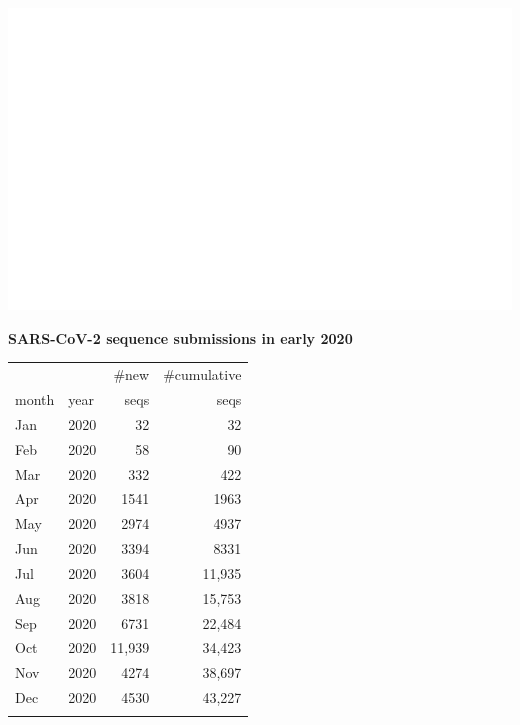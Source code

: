 \documentclass[landscape]{slides}
\begin{document}
\begin{slide}

\includegraphics[width=7in]{figs/blank-slide}
  
\vfill
\end{slide}
\begin{slide}
\begin{center}
\normalsize{\textbf{SARS-CoV-2 sequence submissions in early 2020}}
\end{center}

\begin{center}
\begin{tabular}{llrr}
          &          &\#new     &\#cumulative\\
month     &year      &seqs      &seqs      \\ \hline
Jan       & 2020     &32        &32        \\ 
Feb       & 2020     &58        &90        \\ 
Mar       & 2020     &332       &422       \\ 
Apr       & 2020     &1541      &1963      \\ 
May       & 2020     &2974      &4937      \\ 
Jun       & 2020     &3394      &8331      \\ 
Jul       & 2020     &3604      &11,935    \\ 
Aug       & 2020     &3818      &15,753    \\ 
Sep       & 2020     &6731      &22,484    \\ 
Oct       & 2020     &11,939    &34,423    \\ 
Nov       & 2020     &4274      &38,697    \\ 
Dec       & 2020     &4530      &43,227    \\ 
& & & \\
\end{tabular}
\end{center}

\vfill
\end{slide}
\end{document}
